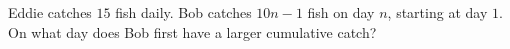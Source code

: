 Eddie catches $15$ fish daily. Bob catches $10n-1$ fish on day $n$, starting at day $1$. On what day does Bob first have a larger cumulative catch?
